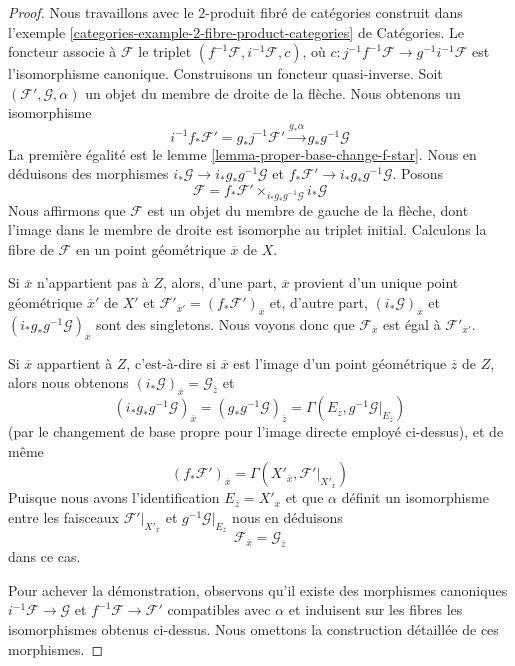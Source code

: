 \begin{proof}
Nous travaillons avec le $2$-produit fibré de catégories construit dans
l'exemple \ref{categories-example-2-fibre-product-categories} de Catégories.
Le foncteur associe à $\mathcal{F}$ le triplet
$(f^{-1}\mathcal{F}, i^{-1}\mathcal{F}, c)$, où
$c : j^{-1}f^{-1}\mathcal{F} \to g^{-1}i^{-1}\mathcal{F}$
est l'isomorphisme canonique. Construisons un foncteur quasi-inverse. Soit
$(\mathcal{F}', \mathcal{G}, \alpha)$ un objet
du membre de droite de la flèche.
Nous obtenons un isomorphisme
$$
i^{-1}f_*\mathcal{F}' = g_*j^{-1}\mathcal{F}'
\xrightarrow{g_*\alpha}
g_*g^{-1}\mathcal{G}
$$
La première égalité est le lemme \ref{lemma-proper-base-change-f-star}.
Nous en déduisons des morphismes
$i_*\mathcal{G} \to i_*g_*g^{-1}\mathcal{G}$
et $f_*\mathcal{F}' \to i_*g_*g^{-1}\mathcal{G}$. Posons
$$
\mathcal{F} = f_*\mathcal{F}' \times_{i_*g_*g^{-1}\mathcal{G}} i_*\mathcal{G}
$$
Nous affirmons que $\mathcal{F}$ est un objet du membre de gauche
de la flèche, dont l'image dans le membre de droite est isomorphe au
triplet initial. Calculons la fibre de $\mathcal{F}$
en un point géométrique $\overline{x}$ de $X$.

\medskip\noindent
Si $\overline{x}$ n'appartient pas
à $Z$, alors, d'une part, $\overline{x}$ provient d'un unique
point géométrique $\overline{x}'$ de $X'$ et
$\mathcal{F}'_{\overline{x}'} = (f_*\mathcal{F}')_{\overline{x}}$
et, d'autre part, $(i_*\mathcal{G})_{\overline{x}}$
et $(i_*g_*g^{-1}\mathcal{G})_{\overline{x}}$ sont des singletons.
Nous voyons donc que $\mathcal{F}_{\overline{x}}$ est égal à
$\mathcal{F}'_{\overline{x}'}$.

\medskip\noindent
Si $\overline{x}$ appartient à $Z$, c'est-à-dire si $\overline{x}$ est l'image d'un
point géométrique $\overline{z}$ de $Z$, alors nous obtenons
$(i_*\mathcal{G})_{\overline{x}} = \mathcal{G}_{\overline{z}}$
et
$$
(i_*g_*g^{-1}\mathcal{G})_{\overline{x}} =
(g_*g^{-1}\mathcal{G})_{\overline{z}} =
\Gamma(E_{\overline{z}}, g^{-1}\mathcal{G}|_{E_{\overline{z}}})
$$
(par le changement de base propre pour l'image directe employé ci-dessus),
et de même
$$
(f_*\mathcal{F}')_{\overline{x}} =
\Gamma(X'_{\overline{x}}, \mathcal{F}'|_{X'_{\overline{x}}})
$$
Puisque nous avons l'identification
$E_{\overline{z}} = X'_{\overline{x}}$ et que $\alpha$
définit un isomorphisme entre les faisceaux
$\mathcal{F}'|_{X'_{\overline{x}}}$ et
$g^{-1}\mathcal{G}|_{E_{\overline{z}}}$
nous en déduisons
$$
\mathcal{F}_{\overline{x}} = \mathcal{G}_{\overline{z}}
$$
dans ce cas.

\medskip\noindent
Pour achever la démonstration, observons qu'il existe des morphismes canoniques
$i^{-1}\mathcal{F} \to \mathcal{G}$ et $f^{-1}\mathcal{F} \to \mathcal{F}'$
compatibles avec $\alpha$ et induisent sur les fibres les isomorphismes
obtenus ci-dessus. Nous omettons la construction détaillée de ces morphismes.
\end{proof}

